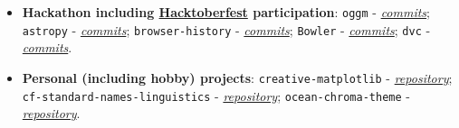 \begin{courses}
{\begin{itemize}
\item \textbf{Hackathon including \href{https://www.digitalocean.com/open-source/hacktoberfest}{Hacktoberfest} participation}:
    \texttt{oggm} - \href{https://github.com/OGGM/oggm/commits?author=sadielbartholomew}{\textit{commits}};
    \texttt{astropy} - \href{https://github.com/astropy/astropy/commits?author=sadielbartholomew}{\textit{commits}};
    \texttt{browser-history} - \href{https://github.com/browser-history/browser-history/commits?author=sadielbartholomew}{\textit{commits}};
    \texttt{Bowler} - \href{https://github.com/facebookincubator/Bowler/commits?author=sadielbartholomew}{\textit{commits}};
    \texttt{dvc} - \href{https://github.com/iterative/dvc/commits?author=sadielbartholomew}{\textit{commits}}.

\item \textbf{Personal (including hobby) projects}:
    \texttt{creative-matplotlib} - \href{https://github.com/sadielbartholomew/creative-matplotlib}{\textit{repository}};
    \texttt{cf-standard-names-linguistics} - \href{https://github.com/sadielbartholomew/cf-standard-names-linguistics}{\textit{repository}};
    \texttt{ocean-chroma-theme} - \href{https://github.com/sadielbartholomew/ocean-chroma-theme}{\textit{repository}}.


    \end{itemize}
}
\end{courses}
\vspace{-3mm}